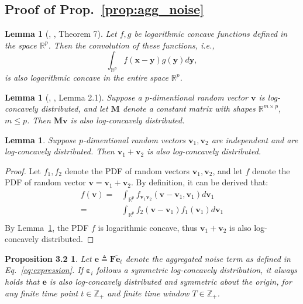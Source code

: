 \documentclass{article}
\theoremstyle{plain}
\newtheorem*{proposition32}{Proposition 3.2}
\newtheorem{lemma}[theorem]{Lemma}
\theoremstyle{definition}
\theoremstyle{remark}
\def \ie {\textit{i.e.}}
\def \Eq {Eq.}
\def \prop {Prop.}
\def \M {\mathbf{M}}
\def \F {\mathbf{F}}
\def \e {\mathbf{e}}
\def \v {\mathbf{v}}
\begin{document}
\subsection{Proof of \prop~\ref{prop:agg_noise}}


\begin{lemma}[\citeauthor{Prkopa1973OnLC}, \citeyear{Prkopa1973OnLC}, Theorem 7]
  \label{lemma:convolution}
  Let $f, g$ be logarithmic concave functions defined in the space $\mathbb{R}^p$. Then the convolution of these functions, \ie, 
\[
  \int_{\mathbb{R}^p} f(\mathbf{x}-\mathbf{y}) g(\mathbf{y}) d \mathbf{y},
\]
is also logarithmic concave in the entire space $\mathbb{R}^p$.
\end{lemma}

\begin{lemma}[\citeauthor{dharmadhikari1988unimodality}, \citeyear{dharmadhikari1988unimodality}, Lemma 2.1]
  \label{lemma:affine_preserve}
  Suppose a \(p\)-dimentional random vector \(\v\) is log-concavely distributed, and let \(\M\) denote a constant matrix with shapes \(\mathbb{R}^{m\times p}\), \(m\leq p\). 
  Then \(\M\v\) is also log-concavely distributed. 
\end{lemma}

\begin{lemma}
  \label{lemma:sum_preserve}
  Suppose \(p\)-dimentional random vectors \(\v_1, \v_2\) are independent and are log-concavely distributed. 
  Then \(\v_1 + \v_2\) is also log-concavely distributed. 
\end{lemma}
\begin{proof}
  Let \(f_1, f_2\) denote the PDF of random vectors \(\v_1, \v_2\), and let \(f\) denote the PDF of random vector \(\v = \v_1 +\v_2\). 
  By definition, it can be derived that:
  \[
    \begin{aligned}
      f(\v) =& \int_{\mathbb{R}^p} f_{\v_1\v_2} (\v-\v_1, \v_1) d \v_1\\
      =& \int_{\mathbb{R}^p} f_2(\v-\v_1) f_1(\v_1) d \v_1\\
    \end{aligned}
  \]
  By Lemma~\ref{lemma:convolution}, the PDF \(f\) is logarithmic concave, thus \(\v_1 + \v_2\) is also log-concavely distributed. 
\end{proof}

\begin{proposition32}
  Let \(\e \triangleq \F\tilde{\e}_t\) denote the aggregated noise term as defined in \Eq~\eqref{eq:expression}. 
  If \(\bm{\varepsilon}_{i}\) follows a symmetric log-concavely distribution, it always holds that \(\e\) is also log-concavely distributed and symmetric about the origin, for any finite time point \(t\in \mathbb{Z}_+\) and finite time window \(T\in \mathbb{Z}_+\). 
\end{proposition32}
\end{document}
